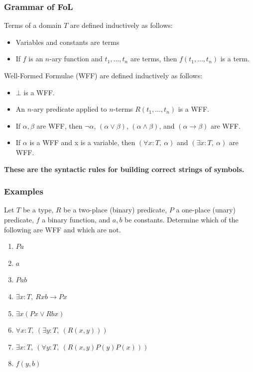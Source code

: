 \documentclass{beamer}
\theoremstyle{indentDefn} \newtheorem{defn}[]{Definition}
\begin{document}
\begin{frame}
	\frametitle{Grammar of FoL}
	
	Terms of a domain $T$ are defined inductively as follows: 
	
	\begin{itemize}
		\item Variables and constants are terms
		\item If $f$ is an $n$-ary function and $t_{1}, ... , t_{n}$ are terms, then $f(t_{1}, ... , t_{n})$ is a term.
	\end{itemize}


	\vspace{2mm}

	Well-Formed Formulae (WFF) are defined inductively as follows: 
	
	\begin{itemize}
		\item $\bot$ is a WFF.
		\item An $n$-ary predicate applied to $n$-terms $R(t_{1}, ... , t_{n})$ is a WFF.
		\item If $\alpha, \beta$ are WFF, then $\lnot \alpha$, $(\alpha \lor \beta)$, $(\alpha \land \beta)$, and $(\alpha \rightarrow \beta)$ are WFF.
		\item If $\alpha$ is a WFF and x is a variable, then $(\forall x : T, \ \alpha)$ and $(\exists x :T, \ \alpha)$ are WFF. 
	\end{itemize}
	
	\textbf{These are the syntactic rules for building correct strings of symbols.}
	
\end{frame}

\begin{frame}
	\frametitle{Examples}
	
	Let $T$ be a type, $R$ be a two-place (binary) predicate, $P$ a one-place (unary) predicate, $f$ a binary function, and $a,b$ be constants.	Determine which of the following are WFF and which are not. 
	
	\begin{enumerate}
		\item $Pa$
		\item $a$
		\item $Pab$
		\item $\exists x : T, \ Rxb \rightarrow Px$
		\item $\exists x (Px \lor Rbx)$
		\item $\forall x : T, \ (\exists y : T, \ (R(x,y)))$
		\item $\exists x : T, \ (\forall y : T, \ (R(x,y)P(y)P(x)))$
		\item $f(y,b)$
	\end{enumerate}
\end{frame}
\end{document}
